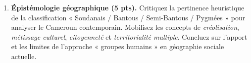 \documentclass[11pt]{article}
\begin{document}
\begin{exercice}
\begin{enumerate}
    \item \textbf{Épistémologie géographique (5 pts).} Critiquez la pertinence heuristique de la classification « Soudanais / Bantous / Semi-Bantous / Pygmées » pour analyser le Cameroun contemporain. Mobilisez les concepts de \textit{créolisation}, \textit{métissage culturel}, \textit{citoyenneté} et \textit{territorialité multiple}. Concluez sur l'apport et les limites de l'approche « groupes humains » en géographie sociale actuelle.
\end{enumerate}
\end{exercice}
\end{document}
